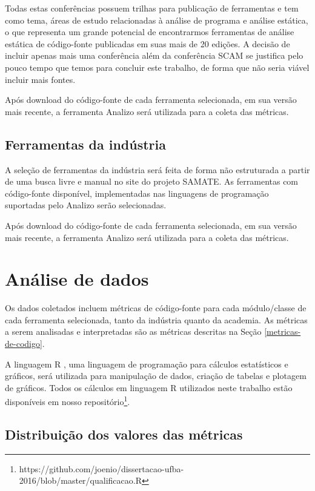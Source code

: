 Todas estas conferências possuem trilhas para publicação de ferramentas e tem
como tema, áreas de estudo relacionadas à análise de programa e análise
estática, o que representa um grande potencial de encontrarmos ferramentas de
análise estática de código-fonte publicadas em suas mais de 20 edições. A
decisão de incluir apenas mais uma conferência além da conferência SCAM se
justifica pelo pouco tempo que temos para concluir este trabalho, de forma que
não seria viável incluir mais fontes.

Após download do código-fonte de cada ferramenta selecionada, em sua versão
mais recente, a ferramenta Analizo será utilizada para a coleta das métricas. 

\subsection{Ferramentas da indústria} \label{ferramentas-da-industria}

A seleção de ferramentas da indústria será feita de forma não estruturada a
partir de uma busca livre e manual no site do projeto SAMATE. As ferramentas
com código-fonte disponível, implementadas nas linguagens de programação
suportadas pelo Analizo serão selecionadas.

Após download do código-fonte de cada ferramenta selecionada, em sua versão
mais recente, a ferramenta Analizo será utilizada para a coleta das métricas. 

\section{Análise de dados} \label{analise}

Os dados coletados incluem métricas de código-fonte para cada módulo/classe de
cada ferramenta selecionada, tanto da indústria quanto da academia. As
métricas a serem analisadas e interpretadas são as métricas descritas na Seção
\ref{metricas-de-codigo}.

A linguagem R \cite{Ihaka1996}, uma linguagem de programação para cálculos
estatísticos e gráficos, será utilizada para manipulação de dados, criação de
tabelas e plotagem de gráficos. Todos os cálculos em linguagem R utilizados
neste trabalho estão disponíveis
em nosso repositório\footnote{https://github.com/joenio/dissertacao-ufba-2016/blob/master/qualificacao.R}.

\subsection{Distribuição dos valores das métricas}

